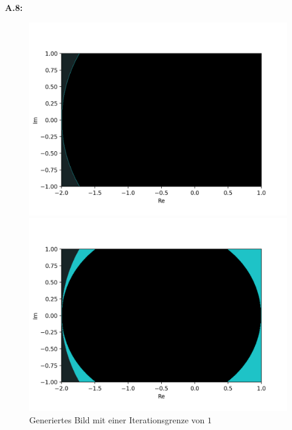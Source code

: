 \noindent\textbf{A.8:}\label{app:8}
\vspace*{-2ex}
\begin{figure}[H]
\centering
\begin{minipage}[t]{0.48\textwidth}
  \centering
  \includegraphics[width=\linewidth]{images/maxBorder/1}
  \vspace*{-8ex}
  \caption{Generiertes Bild mit einer Iterationsgrenze von $1$}
  \label{app:8.1}
\end{minipage}%
\hspace{2ex}
\begin{minipage}[t]{0.48\textwidth}
  \centering
  \includegraphics[width=\linewidth]{images/maxBorder/2}

\end{minipage}
\end{figure}
